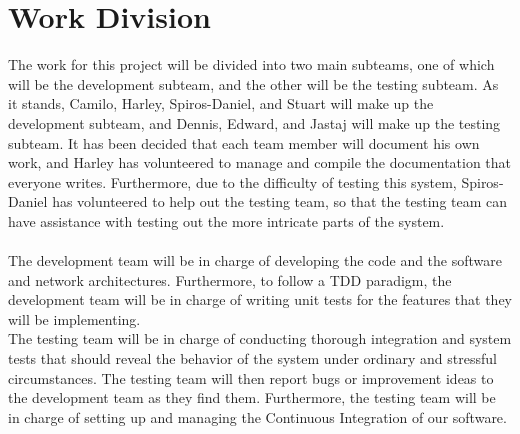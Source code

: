 \documentclass[10pt]{article}
\begin{document}
\section*{Work Division}
The work for this project will be divided into two main subteams, one of which
will be the development subteam, and the other will be the testing subteam. As
it stands, Camilo, Harley, Spiros-Daniel, and Stuart will make up the
development subteam, and Dennis, Edward, and Jastaj will make up the testing
subteam. It has been decided that each team member will document his own work,
and Harley has volunteered to manage and compile the documentation that
everyone writes. Furthermore, due to the difficulty of testing this system,
Spiros-Daniel has volunteered to help out the testing team, so that the testing
team can have assistance with testing out the more intricate parts of the
system.\\\\
The development team will be in charge of developing the code and the software
and network architectures. Furthermore, to follow a TDD paradigm, the
development team will be in charge of writing unit tests for the features that
they will be implementing.\\
The testing team will be in charge of conducting thorough integration and
system tests that should reveal the behavior of the system under ordinary and
stressful circumstances. The testing team will then report bugs or improvement
ideas to the development team as they find them. Furthermore, the testing team
will be in charge of setting up and managing the Continuous Integration of our
software.
\end{document}
